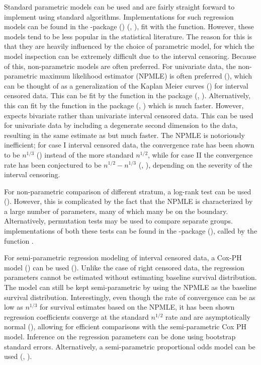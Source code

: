 \documentclass[article]{jss}
\begin{document}
	Standard parametric models can be used and are fairly straight forward to implement using standard algorithms. Implementations for such regression models can be found in the -package (\cite{R})  (\cite{R_surv}, \cite{R_surv_book}), fit with the  function. However, these models tend to be less popular in the statistical literature. The reason for this is that they are heavily influenced by the choice of parametric model, for which the model inspection can be extremely difficult due to the interval censoring. Because of this, non-parametric models are often preferred. For univariate data, the non-parametric maximum likelihood estimator (NPMLE) is often preferred (\cite{Turnbull_1976}), which can be thought of as a generalization of the Kaplan Meier curves (\cite{KM_curve}) for interval censored data. This can be fit by the function  in the package  (\cite{Icens}, \cite{EMICM}). Alternatively, this can fit by the function  in the package  (\cite{MLEcens}, \cite{SupRedAlg}) which is much faster. However,  expects bivariate rather than univariate interval censored data. This can be used for univariate data by including a degenerate second dimension to the data, resulting in the same estimate as  but much faster. The NPMLE is notoriously inefficient; for case I interval censored data, the convergence rate has been shown to be $n^{1/3}$ (\cite{Case1Con}) instead of the more standard $n^{1/2}$, while for case II the convergence rate has been conjectured to be $n^{1/2} - n^{1/3}$ (\cite{Case2Con1}, \cite{Case2Con2}), depending on the severity of the interval censoring. 
	 
	 For non-parametric comparison of different stratum, a log-rank test can be used (\cite{ic_logrankTests}). However, this is complicated by the fact that the NPMLE is characterized by a large number of parameters, many of which many be on the boundary. Alternatively, permutation tests may be used to compare separate groups.  implementations of both these tests can be found in the -package  (\cite{intervalPackage}), called by the function .  
	 
	For semi-parametric regression modeling of interval censored data, a Cox-PH model (\cite{CoxPH}) can be used (\cite{ic_coxph}). Unlike the case of right censored data, the regression parameters cannot be estimated without estimating baseline survival distribution. The model can still be kept semi-parametric by using the NPMLE as the baseline survival distribution. Interestingly, even though the rate of convergence can be as low as $n^{1/3}$ for survival estimates based on the NPMLE, it has been shown regression coefficients converge at the standard $n^{1/2}$ rate and are asymptotically normal (\cite{ic_coxph_asyp}), allowing for efficient comparisons with the semi-parametric Cox PH model. Inference on the regression parameters can be done using bootstrap standard errors. Alternatively, a semi-parametric proportional odds model can be used (\cite{propOdds1}, \cite{propOdds2}). 
\end{document}
